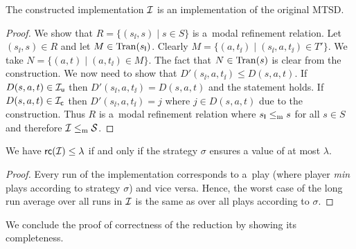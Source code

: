 \begin{lemma}\label{lem:strat2impl}
The constructed implementation $\mathcal I$ is %
an implementation of the original
MTSD. 
\end{lemma}

\begin{proof}
We show that $R = \{ (s_\ii,s) \mid s \in S \}$ is a~modal refinement relation.
Let $(s_\ii,s) \in R$ and let $M \in \mathrm{Tran}(s_\mathsf I)$. Clearly 
$M = \{ (a,t_\ii) \mid (s_\ii,a,t_\ii) \in T'\}$.
We take $N = \{ (a,t) \mid (a,t_\ii) \in M \}$. The fact that $N \in \mathrm{Tran}(s)$ 
is clear from the construction. We now need to show that
$D'(s_\ii,a,t_\ii) \le D(s,a,t)$. 
If $D(s,a,t) \in \mathcal I_\mathsf u$ then $D'(s_\ii,a,t_\ii) = D(s,a,t)$ and
the statement holds.
If $D(s,a,t) \in \mathcal I_\mathsf c$ then $D'(s_\ii,a,t_\ii) = j$ where
$j \in D(s,a,t)$ due to the construction.
Thus $R$ is a~modal refinement relation where 
$s_\mathsf I \le_\mathrm m s$ for all $s \in S$ %
and therefore $\mathcal I \le_\mathrm m \mathcal S$.%
\end{proof}



\begin{lemma}\label{lem:keepsvalue}
We have $\mathsf{rc}(\mathcal I)\leq\lambda$ if and only if the strategy $\sigma$ 
ensures a value of at most $\lambda$.
\end{lemma}

\begin{proof}
Every run of the implementation corresponds to a~play (where player \emph{min}
plays according to strategy $\sigma$) and vice versa. Hence, the worst case of
the long run average over all runs in $\mathcal I$ is the same as over all plays
according to $\sigma$.%
\end{proof}

We conclude the proof of correctness of the reduction by showing its completeness.

